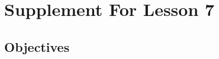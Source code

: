 \documentclass{article}
\begin{document}
\newfontfamily{}
\newfontfamily{}
\newcommand{\bul}{\hfil$\bullet$&}
\renewenvironment{glossary}{\begin{multicols}{5}\begin{center}}{\end{center}\end{multicols}}
\setcounter{secnumdepth}{0}
\setlength{\columnseprule}{1pt}

\section{Supplement For Lesson 7}

\subsection{Objectives}
\end{document}
